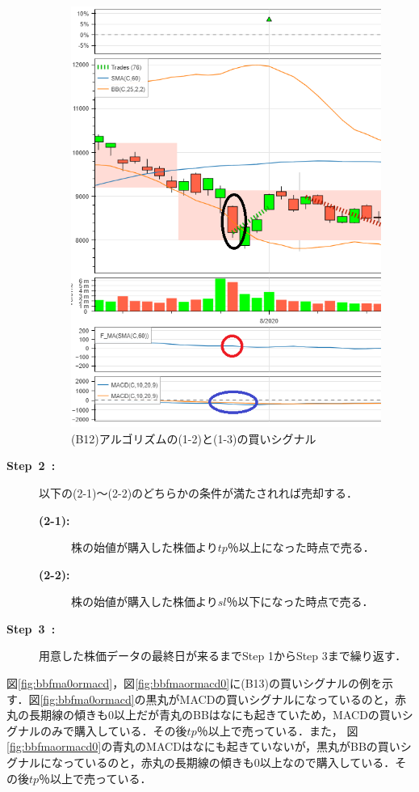 \begin{description}
     \begin{figure}[H]
      \centering
      \includegraphics[width=110mm]{fig/macd0orbb_and_fma_paint.png}
      \caption{(B12)アルゴリズムの(1-2)と(1-3)の買いシグナル}
      \label{fig:bbormacd0fma}
     \end{figure}
    
    \item[\textbf{Step~2~:}]以下の(2-1)～(2-2)のどちらかの条件が満たされれば売却する．
     \begin{description}
      \item[\textbf{(2-1):}]株の始値が購入した株価より$tp$％以上になった時点で売る．
      \item[\textbf{(2-2):}]株の始値が購入した株価より$sl$％以下になった時点で売る． 
     \end{description}
    \item[\textbf{Step~3~:}]用意した株価データの最終日が来るまでStep 1からStep 3まで繰り返す．
    \end{description}

    
     図\ref{fig:bbfma0ormacd}，図\ref{fig:bbfmaormacd0}に(B13)の買いシグナルの例を示す．図\ref{fig:bbfma0ormacd}の黒丸がMACDの買いシグナルになっているのと，赤丸の長期線の傾きも0以上だが青丸のBBはなにも起きていため，MACDの買いシグナルのみで購入している．その後$tp$％以上で売っている．また，
     図\ref{fig:bbfmaormacd0}の青丸のMACDはなにも起きていないが，黒丸がBBの買いシグナルになっているのと，赤丸の長期線の傾きも0以上なので購入している．その後$tp$％以上で売っている．







